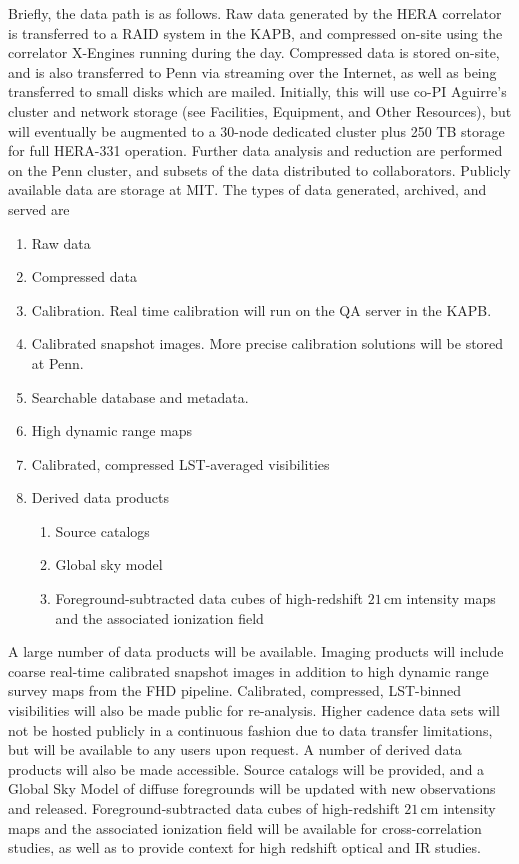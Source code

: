 \documentclass[preprint]{aastex}
\def\EnumCompress{\parskip-4pt}
\begin{document}
Briefly, the data path is as follows. Raw data generated by the HERA correlator is transferred to a RAID system in the KAPB, and compressed on-site using the correlator X-Engines running during the day.  Compressed data is stored on-site, and is also transferred to Penn via streaming over the Internet, as well as being transferred to small disks which are mailed.  Initially, this will use co-PI Aguirre's cluster and network storage (see Facilities, Equipment, and Other Resources), but will eventually be augmented to a 30-node dedicated cluster plus 250 TB storage for full HERA-331 operation.   Further data analysis and reduction are performed on the Penn cluster, and subsets of the data distributed to collaborators.  Publicly available data are storage at MIT.  The types of data generated, archived, and served are
\EnumCompress
\begin{enumerate}
 \EnumCompress
 \item Raw data
 \item Compressed data
 \item Calibration.  Real time calibration will run on the QA server in the KAPB.
 \item Calibrated snapshot images.  More precise calibration solutions will be stored at Penn.
 \item Searchable database and metadata.  
 \item High dynamic range maps
 \item Calibrated, compressed LST-averaged visibilities
 \item Derived data products
 \EnumCompress
 \begin{enumerate}
 \EnumCompress
  \item Source catalogs
  \item Global sky model
  \item Foreground-subtracted data cubes of high-redshift $21\,\textrm{cm}$ intensity maps and the associated ionization field
  \end{enumerate}
\end{enumerate}

\parskip0pt

A large number of data products will be available.  Imaging products will include coarse real-time calibrated snapshot images in addition to high dynamic range survey maps from the FHD pipeline.  Calibrated, compressed, LST-binned visibilities will also be made public for re-analysis.  Higher cadence data sets will not be hosted publicly in a continuous fashion due to data transfer limitations, but will be available to any users upon request.  A number of derived data products will also be made accessible.  Source catalogs will be provided, and a Global Sky Model of diffuse foregrounds will be updated with new observations and released.  Foreground-subtracted data cubes of high-redshift $21\,\textrm{cm}$ intensity maps and the associated ionization field will be available for cross-correlation studies, as well as to provide context for high redshift optical and IR studies.
\end{document}
